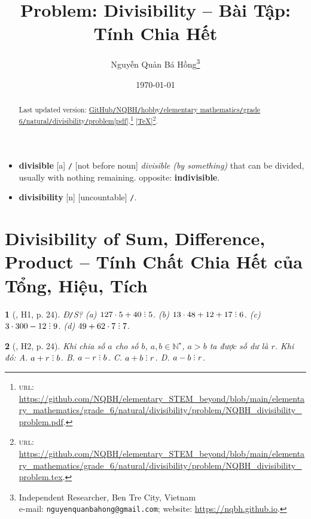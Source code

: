 \documentclass{article}
\title{Problem: Divisibility -- Bài Tập: Tính Chia Hết}
\author{Nguyễn Quản Bá Hồng\footnote{Independent Researcher, Ben Tre City, Vietnam\\e-mail: \texttt{nguyenquanbahong@gmail.com}; website: \url{https://nqbh.github.io}.}}
\date{\today}
\newtheorem{baitoan}{}
\DeclareRobustCommand{\divby}{%
	\mathrel{\vbox{\baselineskip.65ex\lineskiplimit0pt\hbox{.}\hbox{.}\hbox{.}}}%
}
\begin{document}
\maketitle
\begin{abstract}
	Last updated version: \href{https://github.com/NQBH/elementary_STEM_beyond/blob/main/elementary_mathematics/grade_6/natural/divisibility/problem/NQBH_divisibility_problem.pdf}{GitHub{\tt/}NQBH{\tt/}hobby{\tt/}elementary mathematics{\tt/}grade 6{\tt/}natural{\tt/}divisibility{\tt/}problem[pdf]}.\footnote{\textsc{url}: \url{https://github.com/NQBH/elementary_STEM_beyond/blob/main/elementary_mathematics/grade_6/natural/divisibility/problem/NQBH_divisibility_problem.pdf}.} [\href{https://github.com/NQBH/elementary_STEM_beyond/blob/main/elementary_mathematics/grade_6/natural/divisibility/problem/NQBH_divisibility_problem.tex}{\TeX}]\footnote{\textsc{url}: \url{https://github.com/NQBH/elementary_STEM_beyond/blob/main/elementary_mathematics/grade_6/natural/divisibility/problem/NQBH_divisibility_problem.tex}.}. 
\end{abstract}
\tableofcontents


\begin{itemize}\sf
	\item \textbf{divisible} [a] {\tt/} [not before noun] \textit{divisible (by something)} that can be divided, usually with nothing remaining. {\sc opposite}: \textbf{indivisible}.
	\item \textbf{divisibility}  [n] [uncountable] {\tt/}.
\end{itemize}

\section{Divisibility of Sum, Difference, Product -- Tính Chất Chia Hết của Tổng, Hiệu, Tích}

\begin{baitoan}[\cite{Binh_boi_duong_Toan_6_tap_1}, H1, p. 24]
	{\rm Đ{\tt/}S? (a) $127\cdot5 + 40\divby5$. (b) $13\cdot48 + 12 + 17\divby6$. (c) $3\cdot300 - 12\divby9$. (d) $49 + 62\cdot7\divby7$.}
\end{baitoan}

\begin{baitoan}[\cite{Binh_boi_duong_Toan_6_tap_1}, H2, p. 24]
	Khi chia số $a$ cho số $b$, $a,b\in\mathbb{N}^\star$, $a > b$ ta được số dư là $r$. Khi đó: {\sf A.} $a + r\divby b$. {\sf B.} $a - r\divby b$. {\sf C.} $a + b\divby r$. {\sf D.} $a - b\divby r$.
\end{baitoan}
\end{document}

